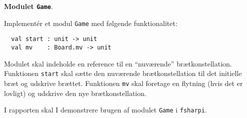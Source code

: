 \textbf{Modulet \texttt{Game}}.

Implementér et modul \lstinline{Game} med følgende funktionalitet:
\begin{lstlisting}
  val start : unit -> unit
  val mv    : Board.mv -> unit
\end{lstlisting}

Modulet skal indeholde en reference til en ``nuværende'' brætkonstellation. Funktionen \lstinline{start} skal sætte den nuværende brætkonstellation til det initielle bræt og udskrive brættet. Funktionen \lstinline{mv} skal foretage en flytning (hvis det er lovligt) og udskrive den nye brætkonstellation.

I rapporten skal I demonstrere brugen af modulet \lstinline{Game}
i \texttt{fsharpi}.

